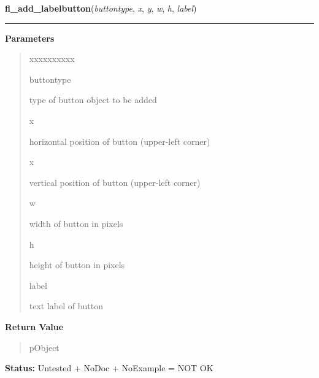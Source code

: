     \label{xformslib:library:fl_add_labelbutton}

    \vspace{0.5ex}

\hspace{.8\funcindent}\begin{boxedminipage}{\funcwidth}

    \raggedright \textbf{fl\_add\_labelbutton}(\textit{buttontype}, \textit{x}, \textit{y}, \textit{w}, \textit{h}, \textit{label})

    \vspace{-1.5ex}

    \rule{\textwidth}{0.5\fboxrule}
\setlength{\parskip}{2ex}
\setlength{\parskip}{1ex}
      \textbf{Parameters}
      \vspace{-1ex}

      \begin{quote}
        \begin{Ventry}{xxxxxxxxxx}

          \item[buttontype]

          type of button object to be added

          \item[x]

          horizontal position of button (upper-left corner)

          \item[x]

          vertical position of button (upper-left corner)

          \item[w]

          width of button in pixels

          \item[h]

          height of button in pixels

          \item[label]

          text label of button

        \end{Ventry}

      \end{quote}

      \textbf{Return Value}
    \vspace{-1ex}

      \begin{quote}
      pObject

      \end{quote}

\textbf{Status:} Untested + NoDoc + NoExample = NOT OK



    \end{boxedminipage}

